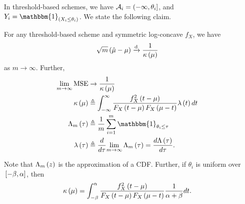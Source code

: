\documentclass[twoside]{article}
\begin{document}
In threshold-based schemes, we have \(\mathcal A_i = (-\infty,\theta_i]\), and
\(Y_i = \mathbbm{1}_{\brak{X_i\le\theta_i}}\). We state the following claim.

\begin{theorem}
    For any threshold-based scheme and symmetric log-concave \(f_X\), we have
    \begin{equation}
        \sqrt{m}\left(\hat{\mu}-\mu\right) \xrightarrow{\mathrm{d}} \frac{1}{\kappa\left(\mu\right)}
    \end{equation}
    as \(m\to\infty\). Further,
    \begin{align}
        \lim_{m\to\infty}\mse &\rightarrow \frac{1}{\kappa\brak{\mu}} \\
        \kappa\brak{\mu} &\triangleq \int_{-\infty}^{\infty}\frac{f_X^2\brak{t-\mu}}{F_X\brak{t-\mu}F_X\brak{\mu-t}}\lambda\brak{t}dt \\
        \Lambda_m\brak{\tau} &\triangleq \frac{1}{m}\sum_{i=1}^m\mathbbm{1}_{\theta_i \le \tau} \\
        \lambda\brak{\tau} &\triangleq \diff{\tau}{\lim_{m\to\infty}\Lambda_m\brak{\tau}} = \frac{d\Lambda\brak{\tau}}{d\tau}.
        \label{eq:thm-defs}
    \end{align}
\end{theorem}

Note that \(\Lambda_m\left(z\right)\) is the approximation of a CDF. Further,
if \(\theta_i\)  is uniform over \({}\left[-\beta,\alpha\right]\), then
\begin{equation}
    \kappa\left(\mu\right) = \int_{-\beta}^{\alpha}\frac{f_X^2\left(t-\mu\right)}{F_X\left(t-\mu\right)F_X\left(\mu-t\right)}\frac{1}{\alpha+\beta}dt.
    \label{eq:kappa-mu-unif}
\end{equation}
\end{document}

